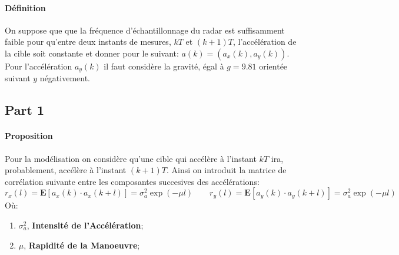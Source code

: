 \documentclass{article}
\begin{document}
\paragraph{Définition}On suppose que que la fréquence d'échantillonnage du radar est suffisamment faible pour qu'entre deux instants de mesures, $kT$ et $(k+1)T$, l'accélération de la cible soit constante et donner pour le suivant: $a(k) = (a_{x}(k), a_{y}(k))$. Pour l'accélération $a_{y}(k)$ il faut considère la gravité, égal à $g = 9.81$ orientée suivant $y$ négativement.
\subsection{Part 1}
\paragraph{Proposition}Pour la modélisation on considère qu'une cible qui accélère à l'instant $kT$ ira, probablement, accélère à l'instant $(k+1)T$. Ainsi on introduit la matrice de corrélation suivante entre les composantes succesives des accélérations:
\begin{equation}
    r_{x} (l) = \mathbf{E}[a_{x}(k) \cdot a_{x}(k+l)] = \sigma_{a}^{2} \exp{(-\mu l)}
    \qquad
    r_{y} (l) = \mathbf{E}[a_{y}(k) \cdot a_{y}(k+l)] = \sigma_{a}^{2} \exp{(-\mu l)}
\end{equation}
\noindent Où:
\begin{enumerate}[noitemsep]
    \item $\sigma_{a}^{2}$, \textbf{Intensité de l'Accélération};
    \item $\mu$, \textbf{Rapidité de la Manoeuvre};
\end{enumerate}
\end{document}

